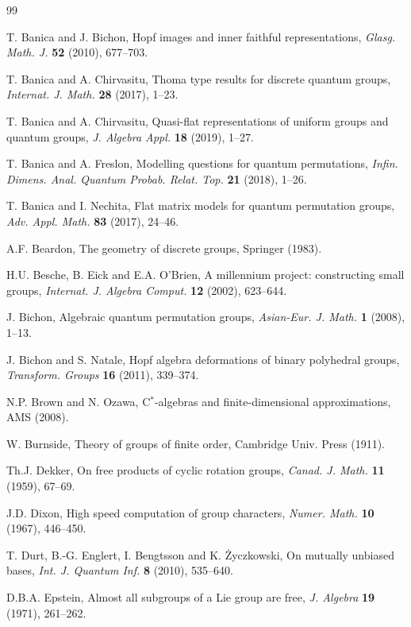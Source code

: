 \documentclass[12pt]{amsart}
\theoremstyle{definition}
\begin{document}
\begin{thebibliography}{99}

T. Banica and J. Bichon, Hopf images and inner faithful representations, {\em Glasg. Math. J.} {\bf 52} (2010), 677--703.

T. Banica and A. Chirvasitu, Thoma type results for discrete quantum groups, {\em Internat. J. Math.} {\bf 28} (2017), 1--23.

T. Banica and A. Chirvasitu, Quasi-flat representations of uniform groups and quantum groups, {\em J. Algebra Appl.} {\bf 18} (2019), 1--27.

T. Banica and A. Freslon, Modelling questions for quantum permutations, {\em Infin. Dimens. Anal. Quantum Probab. Relat. Top.} {\bf 21} (2018), 1--26.

T. Banica and I. Nechita, Flat matrix models for quantum permutation groups, {\em Adv. Appl. Math.} {\bf 83} (2017), 24--46.

A.F. Beardon, The geometry of discrete groups, Springer (1983).

H.U. Besche, B. Eick and E.A. O'Brien, A millennium project: constructing small groups, {\em Internat. J. Algebra Comput.} {\bf 12} (2002), 623--644.

J. Bichon, Algebraic quantum permutation groups, {\em Asian-Eur. J. Math.} {\bf 1} (2008), 1--13.

J. Bichon and S. Natale, Hopf algebra deformations of binary polyhedral groups, {\em Transform. Groups} {\bf 16} (2011), 339--374.

N.P. Brown and N. Ozawa, C$^*$-algebras and finite-dimensional approximations, AMS (2008).

W. Burnside, Theory of groups of finite order, Cambridge Univ. Press (1911).

Th.J. Dekker, On free products of cyclic rotation groups, {\em Canad. J. Math.} {\bf 11} (1959), 67--69.

J.D. Dixon, High speed computation of group characters, {\em Numer. Math.} {\bf 10} (1967), 446--450.

T. Durt, B.-G. Englert, I. Bengtsson and K. \.Zyczkowski, On mutually unbiased bases, {\em Int. J. Quantum Inf.} {\bf 8} (2010), 535--640.

D.B.A. Epstein, Almost all subgroups of a Lie group are free, {\em J. Algebra} {\bf 19} (1971), 261--262.


\end{thebibliography}
\end{document}
